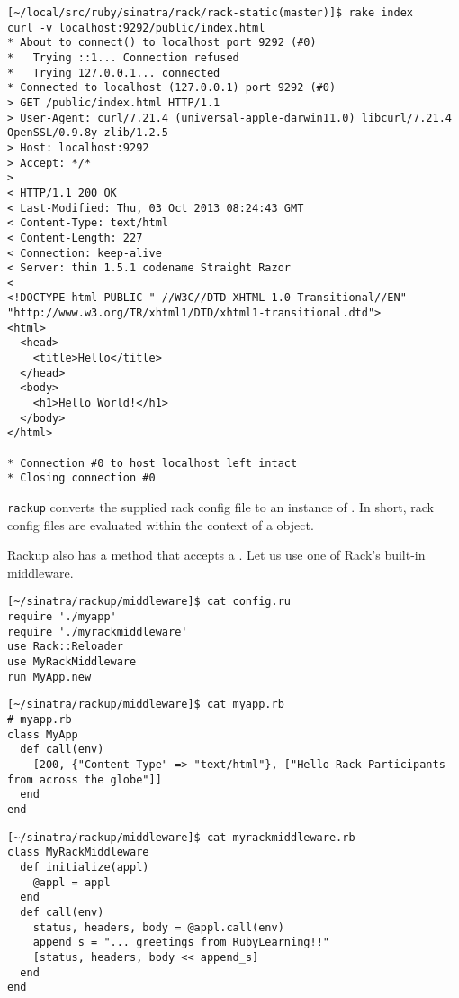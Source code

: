 \begin{verbatim}
[~/local/src/ruby/sinatra/rack/rack-static(master)]$ rake index
curl -v localhost:9292/public/index.html
* About to connect() to localhost port 9292 (#0)
*   Trying ::1... Connection refused
*   Trying 127.0.0.1... connected
* Connected to localhost (127.0.0.1) port 9292 (#0)
> GET /public/index.html HTTP/1.1
> User-Agent: curl/7.21.4 (universal-apple-darwin11.0) libcurl/7.21.4 OpenSSL/0.9.8y zlib/1.2.5
> Host: localhost:9292
> Accept: */*
> 
< HTTP/1.1 200 OK
< Last-Modified: Thu, 03 Oct 2013 08:24:43 GMT
< Content-Type: text/html
< Content-Length: 227
< Connection: keep-alive
< Server: thin 1.5.1 codename Straight Razor
< 
<!DOCTYPE html PUBLIC "-//W3C//DTD XHTML 1.0 Transitional//EN" "http://www.w3.org/TR/xhtml1/DTD/xhtml1-transitional.dtd">
<html>
  <head>
    <title>Hello</title>
  </head>
  <body>
    <h1>Hello World!</h1>
  </body>
</html>

* Connection #0 to host localhost left intact
* Closing connection #0
\end{verbatim}


\verb|rackup| converts the supplied rack config file to an instance of \rackbuilder{}. 
In short, rack config files are evaluated within the context of a \rackbuilder{}
object.

Rackup also has a  method that accepts a . Let us use one
of Rack’s built-in middleware.

\begin{verbatim}
[~/sinatra/rackup/middleware]$ cat config.ru 
require './myapp'
require './myrackmiddleware'
use Rack::Reloader
use MyRackMiddleware
run MyApp.new
\end{verbatim}

\begin{verbatim}
[~/sinatra/rackup/middleware]$ cat myapp.rb 
# myapp.rb
class MyApp
  def call(env)
    [200, {"Content-Type" => "text/html"}, ["Hello Rack Participants from across the globe"]] 
  end
end
\end{verbatim}

\begin{verbatim}
[~/sinatra/rackup/middleware]$ cat myrackmiddleware.rb 
class MyRackMiddleware
  def initialize(appl)
    @appl = appl
  end
  def call(env)
    status, headers, body = @appl.call(env)
    append_s = "... greetings from RubyLearning!!"
    [status, headers, body << append_s]
  end  
end
\end{verbatim}

